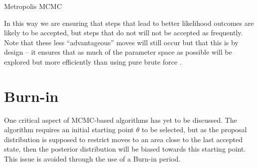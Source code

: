     \begin{algorithm}

        \BlankLine

        \DontPrintSemicolon


        \BlankLine


        \BlankLine


        \BlankLine

        \caption{Metropolis MCMC \label{mhmcmc}}

    \end{algorithm}
    

    In this way we are ensuring that steps that lead to better likelihood outcomes are likely to be accepted, but steps that do not will not be accepted as frequently. Note that these less ``advantageous'' moves will still occur but that this is by design -- it ensures that as much of the parameter space as possible will be explored but more efficiently than using pure brute force \cite{Andrieu2003}.


\section{Burn-in}

    One critical aspect of MCMC-based algorithms has yet to be discussed. The algorithm requires an initial starting point $\theta$ to be selected, but as the proposal distribution is supposed to restrict moves to an area close to the last accepted state, then the posterior distribution will be biased towards this starting point. This issue is avoided through the use of a Burn-in period.

